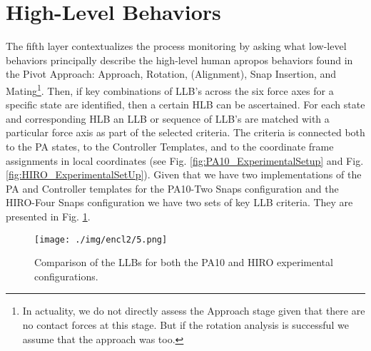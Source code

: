 \section{High-Level Behaviors}\label{subsec:hlbeh}
The fifth layer contextualizes the process monitoring by asking what low-level behaviors principally describe the high-level human apropos behaviors found in the Pivot Approach: Approach, Rotation, (Alignment), Snap Insertion, and Mating\footnote{In actuality, we do not directly assess the Approach stage given that there are no contact forces at this stage. But if the rotation analysis is successful we assume that the approach was too.}.
Then, if key combinations of LLB's across the six force axes for a specific state are identified, then a certain HLB can be ascertained. For each state and corresponding HLB an LLB or sequence of LLB's are matched with a particular force axis as part of the selected criteria. The criteria is connected both to the PA states, to the Controller Templates, and to the coordinate frame assignments in local coordinates (see Fig. \ref{fig:PA10_ExperimentalSetup} and Fig. \ref{fig:HIRO_ExperimentalSetUp}). Given that we have two implementations of the PA and Controller templates for the PA10-Two Snaps configuration and the HIRO-Four Snaps configuration we have two sets of key LLB criteria. They are presented in Fig. \ref{fig:KeyLLBs}.
\begin{figure}[h]
    \centering
    \label{fig:HIRO_KeyLLB}\texttt{[image: ./img/encl2/5.png]}
    \caption{Comparison of the LLBs for both the PA10 and HIRO experimental configurations.}
    \label{fig:KeyLLBs}
\end{figure}
